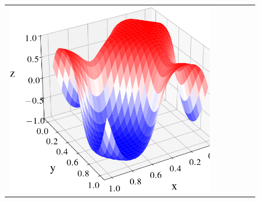 \documentclass[12pt, reqno]{report}
\theoremstyle{definition}
\theoremstyle{remark}
\begin{document}
\begin{figure}[H]
\begin{tabular}{rccccc}
        \includegraphics[align = c, height=\subheight]{media_paper/end_AC_surf_FD_n=1000.png} \\
    

\end{tabular}
\end{figure}
\end{document}

